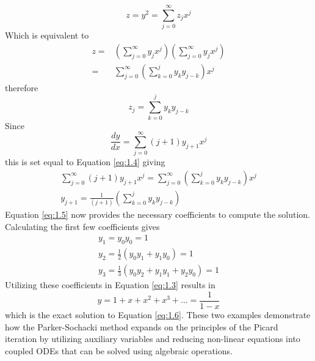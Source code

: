 \documentclass[9pt]{article}
\begin{document}
\begin{multicols}{2}
    \begin{equation}
        z=y^2=\sum_{j=0}^\infty z_jx^j
    \end{equation}
Which is equivalent to
    \begin{equation}\label{eq:1.4}
        \begin{split}
            z=&\left(\sum_{j=0}^\infty y_jx^j\right)\left(\sum_{j=0}^\infty y_jx^j\right)\\
            =&\sum_{j=0}^\infty\left(\sum_{k=0}^jy_ky_{j-k}\right)x^j        
        \end{split}
    \end{equation}
therefore
    \begin{equation}
        z_j=\sum_{k=0}^jy_ky_{j-k}
    \end{equation}
Since  
    \begin{equation}
        \frac{dy}{dx}=\sum_{j=0}^\infty (j+1)y_{j+1}x^j
    \end{equation}
this is set equal to Equation \ref{eq:1.4} giving
    \begin{gather}
        \sum_{j=0}^\infty (j+1)y_{j+1}x^j=\sum_{j=0}^\infty\left(\sum_{k=0}^jy_ky_{j-k}\right)x^j\\
        y_{j+1}=\frac{1}{(j+1)}\left(\sum_{k=0}^jy_ky_{j-k}\right)\label{eq:1.5}
    \end{gather}
Equation \ref{eq:1.5} now provides the necessary coefficients to compute the solution. Calculating the first few coefficients gives
    \begin{equation}
        \begin{split}
            y_1=y_0y_0=1\\
            y_2=\frac{1}{2}\left(y_0y_1+y_1y_0\right)=1\\
            y_3=\frac{1}{3}\left(y_0y_2+y_1y_1+y_2y_0 \right)=1
        \end{split}
    \end{equation}
Utilizing these coefficients in Equation \ref{eq:1.3} results in
    \begin{equation}
        y=1+x+x^2+x^3+\dots=\frac{1}{1-x}
    \end{equation}
which is the exact solution to Equation \ref{eq:1.6}. These two examples demonstrate how the Parker-Sochacki method expands on the principles of the Picard iteration by utilizing auxiliary variables and reducing non-linear equations into coupled ODEs that can be solved using algebraic operations. 

\end{multicols}
\end{document}
